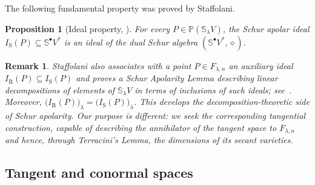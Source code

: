 \documentclass[a4paper,reqno]{amsart}
\theoremstyle{plainnopunct}
\newtheorem{proposition}[proposition]{Proposition}
\theoremstyle{definitionnopunct}
\newtheorem{remark}[remark]{Remark}
\renewcommand{\P}{\mathbb{P}}
\renewcommand{\S}{\mathbb{S}}
\begin{document}
The following fundamental property was proved by Staffolani.

\begin{proposition}[Ideal property, {\cite[Proposition~4.6 and
Remark~4.7]{Staffolani2023}}]
\label{prop: ideal property}
For every $P\in\P(\S_\lambda V)$, the Schur apolar ideal $I_{\mathrm S}(P) \subseteq \S^\bullet V^*$ is an ideal of the dual Schur algebra $(\S^\bullet V^*,\diamond)$.
\end{proposition}

\begin{remark}
\label{rem: Staffolani decomposition side}
Staffolani also associates with a point $P\in F_{\lambda,n}$ an auxiliary ideal $I_{\mathrm R}(P)
\subseteq
I_{\mathrm S}(P)$ and proves a Schur Apolarity Lemma describing linear decompositions of elements of $\S_\lambda V$ in terms of inclusions of such ideals;
see~\cite[Section~4]{Staffolani2023}. Moreover, $\bigl(I_{\mathrm R}(P)\bigr)_\lambda
=
\bigl(I_{\mathrm S}(P)\bigr)_\lambda$. This develops the decomposition-theoretic side of Schur apolarity.
Our purpose is different: we seek the corresponding tangential construction, capable of describing the annihilator of the tangent space to $F_{\lambda,n}$ and hence, through Terracini's Lemma, the dimensions of its secant varieties.
\end{remark}

\subsection{Tangent and conormal spaces}
\label{subsect: tangent and conormal spaces}
\end{document}
